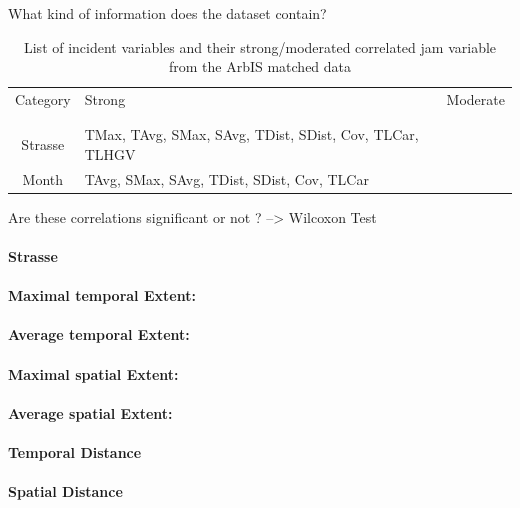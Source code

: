 What kind of information does the dataset contain?

\noindent
\begin{table}[h!]
	\centering
	\begin{tabular}{c|l|l}  
		Category & Strong & Moderate \\
		\\[-1em]
		\hline
		\\[-1em]
		Strasse & TMax, TAvg, SMax, SAvg, TDist, SDist, Cov, TLCar, TLHGV & \\ 
 		Month & TAvg, SMax, SAvg, TDist, SDist, Cov, TLCar & \\
	\end{tabular}
	\caption{List of incident variables and their strong/moderated correlated jam variable from the ArbIS matched data}
\end{table}

Are these correlations significant or not ? --> Wilcoxon Test

\paragraph{Strasse}

\paragraph{Maximal temporal Extent:}
\paragraph{Average temporal Extent:}
\paragraph{Maximal spatial Extent:}
\paragraph{Average spatial Extent:}
\paragraph{Temporal Distance}
\paragraph{Spatial Distance}
